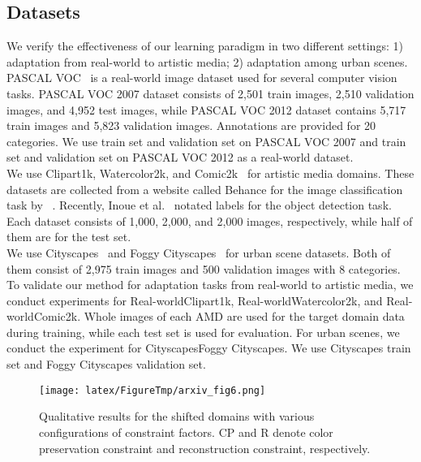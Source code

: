 \documentclass[10pt,twocolumn,letterpaper]{article}
\begin{document}
\subsection{Datasets}
We verify the effectiveness of our learning paradigm in two different settings: 1) adaptation from real-world to artistic media; 2) adaptation among urban scenes.\\

PASCAL VOC~\cite{PascalVoc} is a real-world image dataset used for several computer vision tasks.
PASCAL VOC 2007 dataset consists of 2,501 train images, 2,510 validation images, and 4,952 test images, while PASCAL VOC 2012 dataset contains 5,717 train images and 5,823 validation images.
Annotations are provided for 20 categories.
We use train set and validation set on PASCAL VOC 2007 and train set and validation set on PASCAL VOC 2012 as a real-world dataset.\\

 We use Clipart1k, Watercolor2k, and Comic2k~\cite{Inoue_2018_CVPR} for artistic media domains.
These datasets are collected from a website called Behance for the image classification task by ~\cite{BAM}.
Recently, Inoue et al.~\cite{Inoue_2018_CVPR} notated labels for the object detection task.
Each dataset consists of 1,000, 2,000, and 2,000 images, respectively, while half of them are for the test set.\\

We use Cityscapes~\cite{CityscapesDataset} and Foggy Cityscapes~\cite{Foggy} for urban scene datasets.
Both of them consist of 2,975 train images and 500 validation images with 8 categories.\\

To validate our method for adaptation tasks from real-world to artistic media, we conduct experiments for Real-worldClipart1k, Real-worldWatercolor2k, and Real-worldComic2k.
Whole images of each AMD are used for the target domain data during training, while each test set is used for evaluation.
For urban scenes, we conduct the experiment for CityscapesFoggy Cityscapes. We use Cityscapes train set and Foggy Cityscapes validation set.


\begin{figure*}
\begin{center}
\texttt{[image: latex/FigureTmp/arxiv\_fig6.png]}
\end{center}
  \caption{Qualitative results for the shifted domains with various configurations of constraint factors. CP and R denote color preservation constraint and reconstruction constraint, respectively.}
\label{fig:DomDivFig}
\end{figure*}
\end{document}
